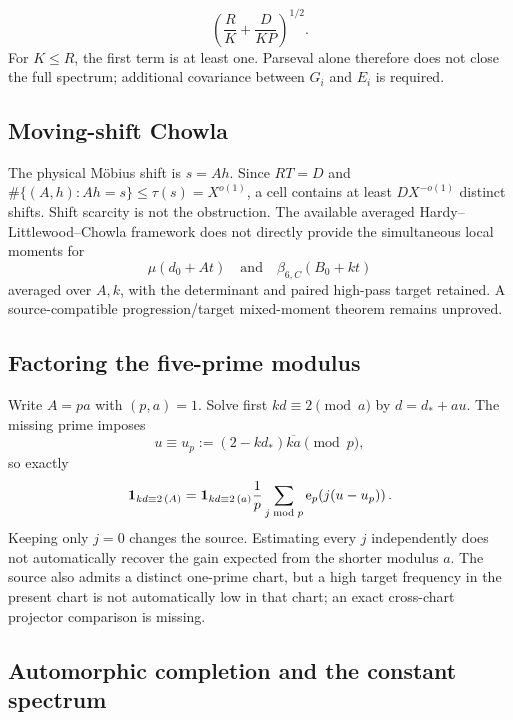 \begin{equation}\label{eq:cardinal-capacity}
             \left(\frac RK+\frac{D}{KP}\right)^{1/2}.
\end{equation}
For $K\le R$, the first term is at least one.  Parseval alone therefore does not
close the full spectrum; additional covariance between $G_i$ and $E_i$ is
required.

\subsection{Moving-shift Chowla}

The physical M\"obius shift is $s=Ah$.  Since $RT=D$ and
$\#\{(A,h):Ah=s\}\le\tau(s)=X^{o(1)}$, a cell contains at least
$DX^{-o(1)}$ distinct shifts.  Shift scarcity is not the obstruction.  The
available averaged Hardy--Littlewood--Chowla framework
\cite{LichtmanTeravainen2022} does not directly provide the simultaneous local
moments for
\[
        \mu(d_0+At)
        \quad\text{and}\quad
        \beta_{6,C}(B_0+kt)
\]
averaged over $A,k$, with the determinant and paired high-pass target retained.
A source-compatible progression/target mixed-moment theorem remains unproved.

\subsection{Factoring the five-prime modulus}

Write $A=pa$ with $(p,a)=1$.  Solve first
$kd\equiv2\pmod a$ by $d=d_*+au$.  The missing prime imposes
\[
       u\equiv u_p:=(2-kd_*)\overline{ka}\pmod p,
\]
so exactly
\begin{equation}\label{eq:factorA}
 \mathbf 1_{kd\equiv2\, (A)}
  =\mathbf 1_{kd\equiv2\, (a)}\frac1p
    \sum_{j\bmod p}\mathrm e_{p}\!\left(j(u-u_p)\right).
\end{equation}
Keeping only $j=0$ changes the source.  Estimating every $j$ independently does
not automatically recover the gain expected from the shorter modulus $a$.
The source also admits a distinct one-prime chart, but a high target frequency
in the present chart is not automatically low in that chart; an exact
cross-chart projector comparison is missing.

\subsection{Automorphic completion and the constant spectrum}

